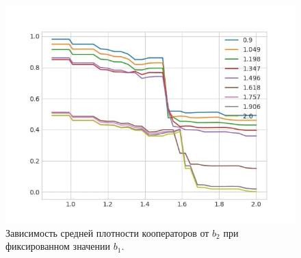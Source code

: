 \documentclass[12pt]{article}
\begin{document}
        \begin{figure}[H]
            \centering
            \includegraphics[width=0.95\columnwidth, keepaspectratio=True]{DoubleField/many.jpg}
            \caption{Зависимость средней плотности кооператоров от $b_2$ при фиксированном значении $b_1$.}
            \label{fig:many}
        \end{figure}
\end{document}
